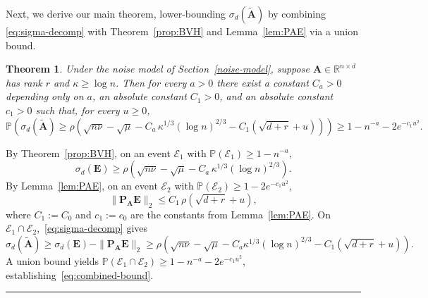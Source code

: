 \documentclass{article}
\newcommand{\twonorm}[1]{\|#1\|_2}
\newcommand{\pr}[1]{\mbox{}\mathbb{P}\left(#1\right)}
\newcommand{\R}{\mathbb{R}} %
\newcommand{\Ab}{\mathbf{A}}
\newcommand{\Eb}{\mathbf{E}}
\newcommand{\Pb}{\mathbf{P}}
\newcommand{\Abtil}{\tilde{\Ab}}
\newcommand{\Ecal}{\mathcal{E}}
\newcommand{\BlackBox}{\rule{1.5ex}{1.5ex}}  %
\newenvironment{proof}{\par\noindent{\bf Proof\ }}{\hfill\BlackBox\par\medskip}
\newtheorem{theorem}{Theorem}
\newcommand{\rbr}[1]{\left(#1\right)}
\begin{document}
Next, we derive our main theorem, lower-bounding $\sigma_d(\Abtil)$ by combining \eqref{eq:sigma-decomp} with Theorem~\ref{prop:BVH} and Lemma~\ref{lem:PAE} via a union bound.
%
\begin{theorem}\label{thm:combined}
Under the noise model of Section~\ref{noise-model}, suppose $\Ab \in \R^{n \times d}$ has rank $r$ and $\kappa \ge \log n$. Then for every $a > 0$ there exist a constant $C_a > 0$ depending only on $a$, an absolute constant $C_1 > 0$, and an absolute constant $c_1 > 0$ such that, for every $u \ge 0$,
\begin{equation}\label{eq:combined-bound}
    \pr{\sigma_d(\Abtil) \ge \rho\rbr{\sqrt{n\nu} - \sqrt{\mu} - C_a\,\kappa^{1/3}(\log n)^{2/3} - C_1\rbr{\sqrt{d+r}+u}}} \ge 1 - n^{-a} - 2 e^{-c_1 u^2}.
\end{equation}
\end{theorem}
\begin{proof}
By Theorem~\ref{prop:BVH}, on an event $\Ecal_1$ with $\pr{\Ecal_1} \ge 1 - n^{-a}$,
\begin{equation*}
    \sigma_d(\Eb) \ge \rho\rbr{\sqrt{n\nu} - \sqrt{\mu} - C_a\,\kappa^{1/3}(\log n)^{2/3}}.
\end{equation*}
By Lemma~\ref{lem:PAE}, on an event $\Ecal_2$ with $\pr{\Ecal_2} \ge 1 - 2 e^{-c_1 u^2}$,
\begin{equation*}
    \twonorm{\Pb_\Ab \Eb} \le C_1\,\rho\rbr{\sqrt{d+r} + u},
\end{equation*}
where $C_1 := C_0$ and $c_1 := c_0$ are the constants from Lemma~\ref{lem:PAE}. On $\Ecal_1 \cap \Ecal_2$,~\eqref{eq:sigma-decomp} gives
\begin{equation*}
    \sigma_d(\Abtil) \ge \sigma_d(\Eb) - \twonorm{\Pb_\Ab \Eb} \ge \rho\rbr{\sqrt{n\nu} - \sqrt{\mu} - C_a \kappa^{1/3}(\log n)^{2/3} - C_1\rbr{\sqrt{d+r}+u}}.
\end{equation*}
A union bound yields $\pr{\Ecal_1 \cap \Ecal_2} \ge 1 - n^{-a} - 2 e^{-c_1 u^2}$, establishing~\eqref{eq:combined-bound}.
\end{proof}
\end{document}
